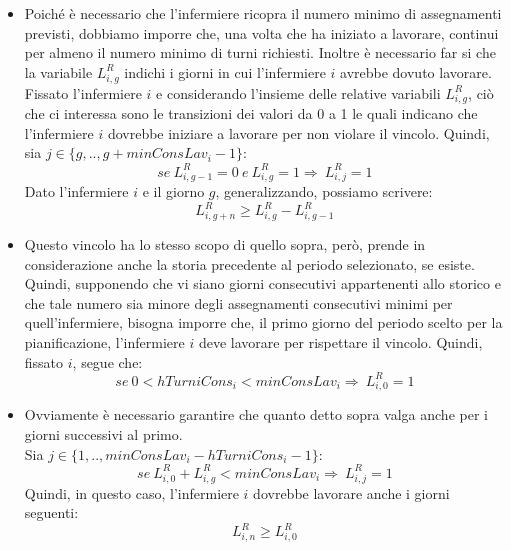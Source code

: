\begin{itemize}
\item Poiché è necessario che l'infermiere ricopra il numero minimo di assegnamenti previsti, dobbiamo imporre che, una volta che ha iniziato a lavorare, continui per almeno il numero minimo di turni richiesti. Inoltre è necessario far si che la variabile $L_{i, g}^R$ indichi i giorni in cui l'infermiere $i$ avrebbe dovuto lavorare.
Fissato l'infermiere $i$ e considerando l'insieme delle relative variabili $L_{i, g}^R$, ciò che ci interessa sono le transizioni dei valori da 0 a 1 le quali indicano che l'infermiere $i$ dovrebbe iniziare a lavorare per non violare il vincolo. 
Quindi, sia $j \in \{g,.., g + minConsLav_i - 1\}$:\\
\begin{equation}
se ~ L_{i, g-1}^R = 0 ~ e ~ L_{i, g}^R = 1 \Longrightarrow\ L_{i, j}^R = 1
\end{equation}
Dato l'infermiere $i$ e il giorno $g$, generalizzando, possiamo scrivere:
\begin{equation}
L_{i, g+n}^R \geq L_{i, g}^R - L_{i, g-1}^R
\end{equation}

\item Questo vincolo ha lo stesso scopo di quello sopra, però, prende in considerazione anche la storia precedente al periodo selezionato, se esiste.
Quindi, supponendo che vi siano giorni consecutivi appartenenti allo storico e che tale numero sia minore degli assegnamenti consecutivi minimi per quell'infermiere, bisogna imporre che, il primo giorno del periodo scelto per la pianificazione, l'infermiere $i$ deve lavorare per rispettare il vincolo. Quindi, fissato $i$, segue che:
\begin{equation}
se ~ 0 < hTurniCons_i < minConsLav_i \Longrightarrow\ L_{i, 0}^R = 1
\end{equation}

\item Ovviamente è necessario garantire che quanto detto sopra valga anche per i giorni successivi al primo. \\
Sia  $j \in \{1,.., minConsLav_i - hTurniCons_i - 1\}$:\\
\begin{equation}
se ~ L_{i, 0}^R + L_{i, g}^R <  minConsLav_i \Longrightarrow\ L_{i, j}^R = 1
\end{equation}
Quindi, in questo caso, l'infermiere $i$ dovrebbe lavorare anche i giorni seguenti:
\begin{equation}
L_{i, n}^R \geq L_{i, 0}^R
\end{equation}
\end{itemize}

